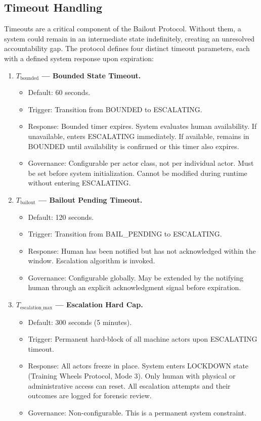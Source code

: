 \subsection{Timeout Handling}

Timeouts are a critical component of the Bailout Protocol. Without them, a system could remain in an intermediate state indefinitely, creating an unresolved accountability gap. The protocol defines four distinct timeout parameters, each with a defined system response upon expiration:

\begin{enumerate}

\item \textbf{$T_{\text{bounded}}$ --- Bounded State Timeout.}
\begin{itemize}
    \item Default: 60 seconds.
    \item Trigger: Transition from BOUNDED to ESCALATING.
    \item Response: Bounded timer expires. System evaluates human availability. If unavailable, enters ESCALATING immediately. If available, remains in BOUNDED until availability is confirmed or this timer also expires.
    \item Governance: Configurable per actor class, not per individual actor. Must be set before system initialization. Cannot be modified during runtime without entering ESCALATING.
\end{itemize}

\item \textbf{$T_{\text{bailout}}$ --- Bailout Pending Timeout.}
\begin{itemize}
    \item Default: 120 seconds.
    \item Trigger: Transition from BAIL\_PENDING to ESCALATING.
    \item Response: Human has been notified but has not acknowledged within the window. Escalation algorithm is invoked.
    \item Governance: Configurable globally. May be extended by the notifying human through an explicit acknowledgment signal before expiration.
\end{itemize}

\item \textbf{$T_{\text{escalation\_max}}$ --- Escalation Hard Cap.}
\begin{itemize}
    \item Default: 300 seconds (5 minutes).
    \item Trigger: Permanent hard-block of all machine actors upon ESCALATING timeout.
    \item Response: All actors freeze in place. System enters LOCKDOWN state (Training Wheels Protocol, Mode 3). Only human with physical or administrative access can reset. All escalation attempts and their outcomes are logged for forensic review.
    \item Governance: Non-configurable. This is a permanent system constraint.
\end{itemize}


\end{enumerate}
